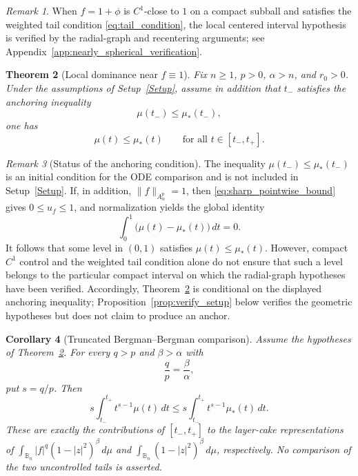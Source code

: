 \documentclass[11pt]{amsart}
\theoremstyle{plain}
\newtheorem{theorem}{Theorem}[section]
\newtheorem{corollary}[theorem]{Corollary}
\theoremstyle{definition}
\theoremstyle{remark}
\newtheorem{remark}[theorem]{Remark}
\newcommand{\B}{\mathbb{B}}
\begin{document}
\begin{remark}
When \(f=1+\phi\) is \(C^1\)-close to \(1\) on a compact subball and satisfies
the weighted tail condition \eqref{eq:tail_condition}, the local centered
interval hypothesis is verified by the radial-graph and recentering arguments;
see Appendix~\ref{app:nearly_spherical_verification}.
\end{remark}

\begin{theorem}[Local dominance near \(f\equiv 1\)]\label{thm:local_dominance}
Fix \(n\ge 1\), \(p>0\), \(\alpha>n\), and \(r_0>0\). Under the assumptions
of Setup~\ref{Setup}, assume in addition that \(t_-\) satisfies the anchoring inequality
\[
\mu(t_-)\le \mu_*(t_-),
\]
one has
\[
\mu(t)\le \mu_*(t)\qquad\text{for all }t\in[t_-,t_+].
\]
\end{theorem}

\begin{remark}[Status of the anchoring condition]\label{rem:anchoring_status}
The inequality $\mu(t_-)\le\mu_*(t_-)$ is an initial condition for the ODE
comparison and is not included in Setup~\ref{Setup}. If, in addition,
$\|f\|_{A^p_\alpha}=1$, then \eqref{eq:sharp_pointwise_bound} gives
$0\le u_f\le1$, and normalization yields the global identity
\[
 \int_0^1\bigl(\mu(t)-\mu_*(t)\bigr)\,dt=0.
\]
It follows that some level in $(0,1)$ satisfies
$\mu(t)\le\mu_*(t)$. However, compact $C^1$ control and the weighted tail
condition alone do not ensure that such a level belongs to the particular
compact interval on which the radial-graph hypotheses have been verified.
Accordingly, Theorem~\ref{thm:local_dominance} is conditional on the displayed
anchoring inequality; Proposition~\ref{prop:verify_setup} below verifies the
geometric hypotheses but does not claim to produce an anchor.
\end{remark}

\begin{corollary}[Truncated Bergman--Bergman comparison]\label{cor:local_contraction}
Assume the hypotheses of Theorem~\ref{thm:local_dominance}. For every \(q>p\) and \(\beta>\alpha\) with
\[
\frac{q}{p}=\frac{\beta}{\alpha},
\]
put $s=q/p$. Then
\begin{equation}\label{eq:local_contraction_new}
s\int_{t_-}^{t_+}t^{s-1}\mu(t)\,dt
\le s\int_{t_-}^{t_+}t^{s-1}\mu_*(t)\,dt.
\end{equation}
These are exactly the contributions of $[t_-,t_+]$ to the layer-cake
representations of
$\int_{\B_n}|f|^q(1-|z|^2)^\beta\,d\mu$ and
$\int_{\B_n}(1-|z|^2)^\beta\,d\mu$, respectively.  No comparison of the two
uncontrolled tails is asserted.
\end{corollary}
\end{document}
